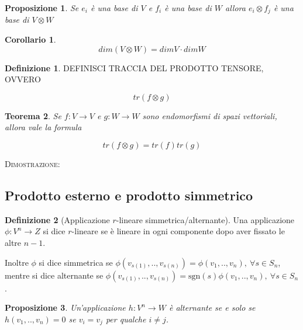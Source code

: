 \documentclass[11pt]{article}
\theoremstyle{plain}
\newtheorem{thm}{Teorema}[section]
\newtheorem{prop}[thm]{Proposizione}
\newtheorem*{cor}{Corollario}
\theoremstyle{definition}
\newtheorem{defn}{Definizione}[section]
\theoremstyle{remark}
\begin{document}
\begin{prop}

Se $e_i$ è una base di $V$ e $f_i$ è una base di $W$ allora $e_i \otimes f_j$ è una base di $V \otimes W$
\end{prop}


\begin{cor}
\[dim(V \otimes W) = dim V \cdot dim W \]

\end{cor}

















\begin{defn}
DEFINISCI TRACCIA DEL PRODOTTO TENSORE, OVVERO 

\[ tr(f\otimes g)\]

\end{defn}


\begin{thm}
Se $f:V\to V$ e $g:W\to W$ sono endomorfismi di spazi vettoriali, allora vale la formula

\[tr(f\otimes g) = tr(f) tr(g)  \]

\end{thm}

\textsc{Dimostrazione:}


\subsection{Prodotto esterno e prodotto simmetrico}

\begin{defn}[Applicazione $r$-lineare simmetrica/alternante]
 Una applicazione $\phi: V^n \to Z$ si dice $r$-lineare se è lineare in ogni componente dopo aver fissato le altre $n-1$.

 Inoltre $\phi$ si dice simmetrica se $\phi(v_{s(1)},..,v_{s(n)})=\phi(v_1,..,v_n),\ \forall s \in S_n$, mentre si dice 
 alternante se $\phi(v_{s(1)},..,v_{s(n)})=\mathrm{sgn}(s)\phi(v_1,..,v_n),\ \forall s \in S_n$.
 
\end{defn}

\begin{prop}
 Un'applicazione $h: V^n \to W$ è alternante se e solo se $h(v_1,..,v_n)=0$ se $v_i=v_j$ per qualche $i\neq j$.
 \end{prop}
\end{document}
